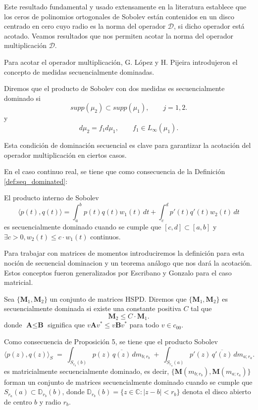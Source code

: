 Este resultado fundamental y usado extensamente en la literatura establece que los ceros de polinomios ortogonales de Sobolev están contenidos en un disco centrado en cero cuyo radio es la norma del operador $\mathcal{D}$, si dicho operador está acotado. Veamos resultados que nos permiten acotar la norma del operador multiplicación $\mathcal{D}$.

Para acotar el operador multiplicación, G. López y H. Pijeira \cite{lagomasino1999zero} introdujeron el concepto de medidas secuencialmente dominadas.

\begin{definition}
  \cite{lagomasino1999zero} Diremos que el producto de Sobolev con dos medidas es secuencialmente dominado si
  $$supp(\mu_2) \subset supp(\mu_{1}) , \qquad j = 1,2.$$ y
  $$d\mu_2 = f_{1}d\mu_{1}, \qquad f_{1} \in L_{\infty}(\mu_{1}).$$
\end{definition}

Esta condición de dominación secuencial es clave para garantizar la acotación del operador multiplicación en ciertos casos.

En el caso continuo real, se tiene que como consecuencia de la Definición \ref{def:seq_dominated}:

\begin{corollary}
  El producto interno de Sobolev
  $$\langle p(t), q(t) \rangle = \int_{a}^{b} p(t) q(t) w_1(t) \, dt + \int_{c}^{d} p'(t) q'(t) w_2(t) \, dt$$
  es secuencialmente dominado cuando se cumple que $[c,d] \subset [a,b]$ y $\exists c > 0, w_2(t)\leq c \cdot w_1(t)$ continuos.
\end{corollary}

Para trabajar con matrices de momentos introduciremos la definición para esta noción de secuencial dominacion y un teorema análogo que nos dará la acotación. Estos conceptos fueron generalizados por Escribano y Gonzalo \cite{escribano2025boundedness} para el caso matricial.

\begin{definition}\label{def:seq_dominated}
  \cite{escribano2025boundedness} Sea $\{\textbf{M}_1,\textbf{M}_2\}$ un conjunto de matrices HSPD. Diremos que $\{\textbf{M}_1,\textbf{M}_2\}$ es secuencialmente dominada si existe una constante positiva $C$ tal que
  $$\textbf{M}_2 \leq C \cdot \textbf{M}_{1}.$$
  donde $\textbf{A} \leq \textbf{B}$ significa que $v\textbf{A}v^* \leq v\textbf{B}v^*$ para todo $v \in c_{00}$.
\end{definition}

Como consecuencia de \cite{escribano2025zeros} Proposición 5, se tiene que el producto Sobolev
$$\langle p(z) , q(z) \rangle_{S}\;=\;
  \int_{S_{r_b}(b)} p(z)\,\overline{q(z)} \, dm_{b;r_b}
  \;+\;
  \int_{S_{r_a}(a)} p'(z)\,\overline{q'(z)} \, dm_{a;r_a}.$$
es matricialmente secuencialmente dominado, es decir, $\{\textbf{M}(m_{b;r_b}),\textbf{M}(m_{a;r_a})\}$ forman un conjunto de matrices secuencialmente dominado cuando se cumple que $S_{r_a}(a)\subset \mathbb{D}_{r_b}(b)$, donde $\mathbb{D}_{r_b}(b) = \{z \in \mathbb{C} : |z - b| < r_b\}$ denota el disco abierto de centro $b$ y radio $r_b$.

